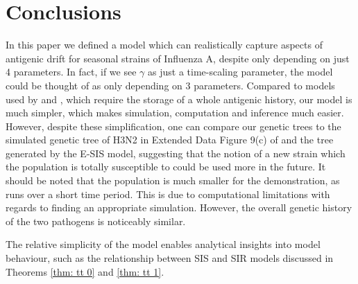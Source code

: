 \documentclass[smallextended]{svjour3}       %
\begin{document}

\section{Conclusions}
 In this paper we defined a model which can realistically capture aspects of antigenic drift for seasonal strains of Influenza A, despite only depending on just 4 parameters. In fact, if we see $\gamma$ as just a time-scaling parameter, the model could be thought of as only depending on 3 parameters. Compared to models used by \cite{bedford2015} and \cite{parisi2013}, which require the storage of a whole antigenic history, our model is much simpler, which makes simulation, computation and inference much easier. 
 However, despite these simplification, one can compare our genetic trees to the simulated genetic tree of H3N2 in Extended Data Figure 9(c) of \cite{bedford2015} and the tree generated by the E-SIS model, suggesting that the notion of a new strain which the population is totally susceptible to could be used more in the future. 
 It should be noted that the population is much smaller for the demonstration, as runs over a short time period. This is due to computational limitations with regards to finding an appropriate simulation. However, the overall genetic history of the two pathogens is noticeably similar.

The relative simplicity of the model enables analytical insights into model behaviour, such as the relationship between SIS and SIR models discussed in Theorems  \ref{thm: tt 0} and \ref{thm: tt 1}.



\end{document}
